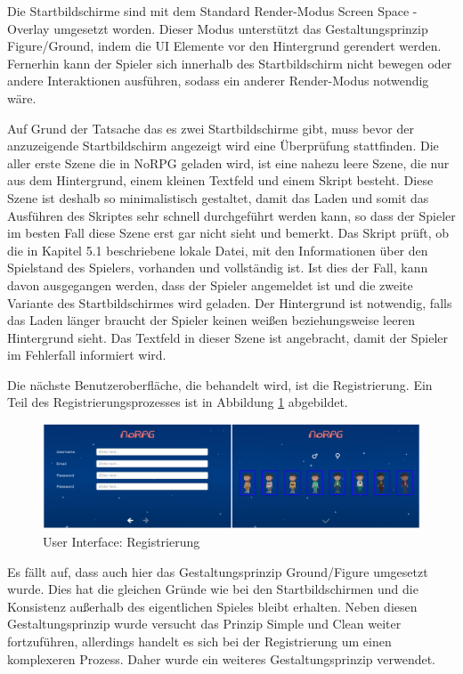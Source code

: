 				Die Startbildschirme sind mit dem Standard Render-Modus Screen Space - Overlay umgesetzt worden. Dieser Modus unterstützt das Gestaltungsprinzip Figure/Ground, indem die \ac{UI} Elemente vor den Hintergrund gerendert werden. Fernerhin kann der Spieler sich innerhalb des Startbildschirm nicht bewegen oder andere Interaktionen ausführen, sodass ein anderer Render-Modus notwendig wäre.

				Auf Grund der Tatsache das es zwei Startbildschirme gibt, muss bevor der anzuzeigende Startbildschirm angezeigt wird eine Überprüfung stattfinden. Die aller erste Szene die in NoRPG geladen wird, ist eine nahezu leere Szene, die nur aus dem Hintergrund, einem kleinen Textfeld und einem Skript besteht. Diese Szene ist deshalb so minimalistisch gestaltet, damit das Laden und somit das Ausführen des Skriptes sehr schnell durchgeführt werden kann, so dass der Spieler im besten Fall diese Szene erst gar nicht sieht und bemerkt. Das Skript prüft, ob die in Kapitel 5.1 beschriebene lokale Datei, mit den Informationen über den Spielstand des Spielers, vorhanden und vollständig ist. Ist dies der Fall, kann davon ausgegangen werden, dass der Spieler angemeldet ist und die zweite Variante des Startbildschirmes wird geladen. Der Hintergrund ist notwendig, falls das Laden länger braucht der Spieler keinen weißen beziehungsweise leeren Hintergrund sieht. Das Textfeld in dieser Szene ist angebracht, damit der Spieler im Fehlerfall informiert wird.

				Die nächste Benutzeroberfläche, die behandelt wird, ist die Registrierung. Ein Teil des Registrierungsprozesses ist in Abbildung \ref{registerUI} abgebildet.

				\begin{figure}[htbp]
					\centering 
					\label{registerUI}
					\includegraphics[width=\textwidth]{pics/registerScreen.png}
					\caption{User Interface: Registrierung}
				\end{figure}

				Es fällt auf, dass auch hier das Gestaltungsprinzip Ground/Figure umgesetzt wurde. Dies hat die gleichen Gründe wie bei den Startbildschirmen und die Konsistenz außerhalb des eigentlichen Spieles bleibt erhalten. Neben diesen Gestaltungsprinzip wurde versucht das Prinzip Simple und Clean weiter fortzuführen, allerdings handelt es sich bei der Registrierung um einen komplexeren Prozess. Daher wurde ein weiteres Gestaltungsprinzip verwendet. 
				
